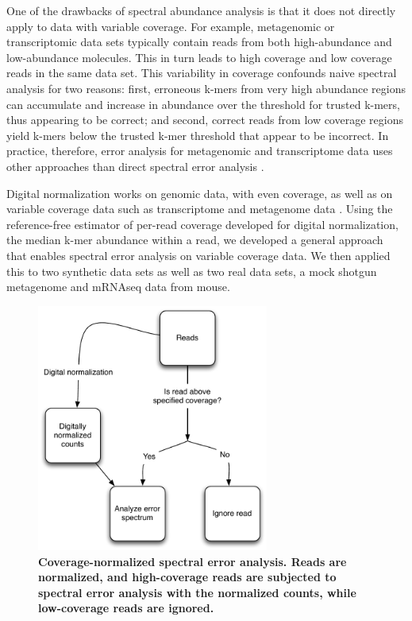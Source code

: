 \documentclass{article}
\begin{document}
One of the drawbacks of spectral
abundance analysis is that it does not directly apply to data with
variable coverage.  For example, metagenomic or transcriptomic data
sets typically contain reads from both high-abundance and
low-abundance molecules.  This in turn leads to high coverage and low
coverage reads in the same data set. This variability in coverage
confounds naive spectral analysis for two reasons: first, erroneous
k-mers from very high abundance regions can accumulate and increase in
abundance over the threshold for trusted k-mers, thus appearing to be
correct; and second, correct reads from low coverage regions yield
k-mers below the trusted k-mer threshold that appear to be incorrect.
In practice, therefore, error analysis for metagenomic and
transcriptome data uses other approaches than direct spectral error
analysis \cite{Medvedev2011,others}.

Digital normalization works on genomic data, with even coverage, as
well as on variable coverage data such as transcriptome and metagenome
data \cite{Brown2012, Lowe2015}.  Using the reference-free estimator
of per-read coverage developed for digital normalization, the median
k-mer abundance within a read, we developed a general approach that
enables spectral error analysis on variable coverage data.  We then
applied this to two synthetic data sets as well as two real data sets,
a mock shotgun metagenome and mRNAseq data from mouse.

\begin{figure}[!ht]
 \centerline{\includegraphics[width=3in]{./figures/coverage-aware-spectrum}}
\caption{{\bf Coverage-normalized spectral error analysis.  Reads are
    normalized, and high-coverage reads are subjected to spectral
    error analysis with the normalized counts, while low-coverage
    reads are ignored.}}
\label{fig:covaware}
\end{figure}
\end{document}
